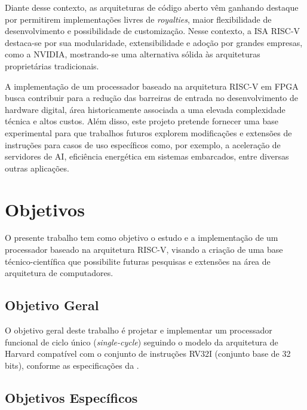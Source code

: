 Diante desse contexto, as arquiteturas de código aberto vêm ganhando destaque por permitirem implementações livres de \textit{royalties}, maior flexibilidade de desenvolvimento e possibilidade de customização. Nesse contexto, a ISA RISC-V destaca-se por sua modularidade, extensibilidade e adoção por grandes empresas, como a NVIDIA, mostrando-se uma alternativa sólida às arquiteturas proprietárias tradicionais.

A implementação de um processador baseado na arquitetura RISC-V em FPGA busca contribuir para a redução das barreiras de entrada no desenvolvimento de hardware digital, área historicamente associada a uma elevada complexidade técnica e altos custos. Além disso, este projeto pretende fornecer uma base experimental para que trabalhos futuros explorem modificações e extensões de instruções para casos de uso específicos como, por exemplo, a aceleração de servidores de AI, eficiência energética em sistemas embarcados, entre diversas outras aplicações.

\section{Objetivos}
O presente trabalho tem como objetivo o estudo e a implementação de um processador baseado na arquitetura RISC-V, visando a criação de uma base técnico-científica que possibilite futuras pesquisas e extensões na área de arquitetura de computadores. 

\subsection{Objetivo Geral}
O objetivo geral deste trabalho é projetar e implementar um processador funcional de ciclo único (\textit{single-cycle}) seguindo o modelo da arquitetura de Harvard compatível com o conjunto de instruções RV32I (conjunto base de 32 bits), conforme as especificações da . 

\subsection{Objetivos Específicos}

